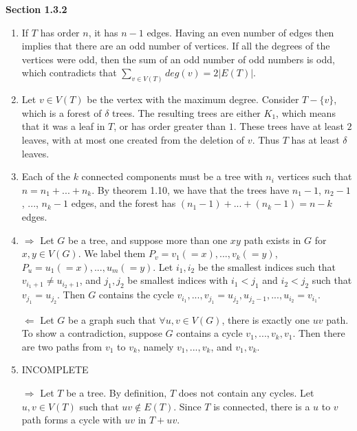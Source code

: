 \documentclass[11pt]{article}
\begin{document}
{\bfseries Section 1.3.2}

\begin{enumerate}[1]
    \addtocounter{enumi}{1}
    \item 
        If $T$ has order $n$, it has $n - 1$ edges. Having an even number of 
        edges 
        then implies that there are an odd number of vertices. If all the degrees 
        of the vertices were odd, then the sum of an odd number of odd numbers is
        odd, which contradicts that $\sum_{v \in V(T)} deg(v) = 2|E(T)|$.
    \item
        Let $v \in V(T)$ be the vertex with the maximum degree. Consider 
        $T - \{v\}$, which is a forest of $\delta$ trees. The resulting 
        trees are either $K_1$, which means that it was a leaf in $T$, or has 
        order greater than $1$. These trees have at least $2$ leaves, with at most 
        one created from the deletion of $v$. Thus $T$ has at least $\delta$ leaves.
    \item
        Each of the $k$ connected components must be a tree with $n_i$ vertices 
        such that $n = n_1 + ... + n_k$. By theorem 1.10, we have that the trees 
        have $n_1 - 1$, $n_2 - 1$, ..., $n_k - 1$ edges, and the forest has 
        $(n_1 - 1) + ... + (n_k - 1) = n - k$ edges.
    \item %
        $\Rightarrow$ Let $G$ be a tree, and suppose more than one $xy$ path
        exists in $G$ for $x,y \in V(G)$. We label them 
        $P_v = v_1 (= x), ..., v_k (= y)$, 
        $P_u = u_1 (= x), ..., u_m (= y)$. Let $i_1, i_2$ be the 
        smallest indices such that $v_{i_1 + 1} \neq u_{i_2 + 1}$, and $j_1, j_2$ 
        be smallest indices with $i_1 < j_1$ and $i_2 < j_2$ such that 
        $v_{j_1} = u_{j_2}$. Then $G$ contains the cycle
        $v_{i_1}, ..., v_{j_1} = u_{j_2}, u_{j_2 - 1}, ..., u_{i_2} = v_{i_1}$. 
        
        $\Leftarrow$ Let $G$ be a graph such that $\forall u,v \in V(G)$, there 
        is exactly one $uv$ path. To show a contradiction, suppose $G$ contains 
        a cycle $v_1, ..., v_k, v_1$. Then there are two paths from $v_1$ to 
        $v_k$, namely $v_1, ..., v_k$, and $v_1, v_k$. 

    \item %
        INCOMPLETE

        $\Rightarrow$ Let $T$ be a tree. By definition, $T$ does not contain 
        any cycles. Let $u,v \in V(T)$ such that $uv \notin E(T)$. Since $T$
        is connected, there is a $u$ to $v$ path forms a cycle with $uv$ in 
        $T + uv$. 


\end{enumerate}
\end{document}

